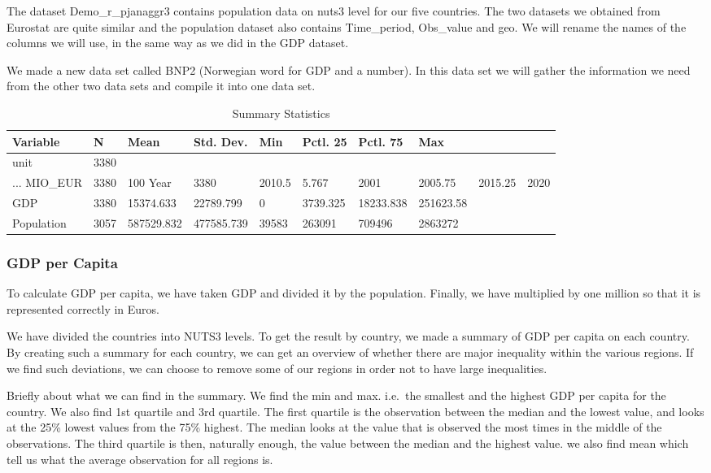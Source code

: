 \documentclass[
]{article}
\begin{document}
The dataset Demo\_r\_pjanaggr3 contains population data on nuts3 level
for our five countries. The two datasets we obtained from Eurostat are
quite similar and the population dataset also contains Time\_period,
Obs\_value and geo. We will rename the names of the columns we will use,
in the same way as we did in the GDP dataset.

We made a new data set called BNP2 (Norwegian word for GDP and a
number). In this data set we will gather the information we need from
the other two data sets and compile it into one data set.

\begin{table}

\caption{\label{tab:unnamed-chunk-1}Summary Statistics}
\centering
\begin{tabular}[t]{llllllll}
\toprule
Variable & N & Mean & Std. Dev. & Min & Pctl. 25 & Pctl. 75 & Max\\
\midrule
unit & 3380 &  &  &  &  &  & \\
... MIO_EUR & 3380 & 100%
Year & 3380 & 2010.5 & 5.767 & 2001 & 2005.75 & 2015.25 & 2020\\
GDP & 3380 & 15374.633 & 22789.799 & 0 & 3739.325 & 18233.838 & 251623.58\\
Population & 3057 & 587529.832 & 477585.739 & 39583 & 263091 & 709496 & 2863272\\
\bottomrule
\end{tabular}
\end{table}

\hypertarget{gdp-per-capita}{%
\subsubsection{GDP per Capita}\label{gdp-per-capita}}

To calculate GDP per capita, we have taken GDP and divided it by the
population. Finally, we have multiplied by one million so that it is
represented correctly in Euros.

We have divided the countries into NUTS3 levels. To get the result by
country, we made a summary of GDP per capita on each country. By
creating such a summary for each country, we can get an overview of
whether there are major inequality within the various regions. If we
find such deviations, we can choose to remove some of our regions in
order not to have large inequalities.

Briefly about what we can find in the summary. We find the min and max.
i.e.~the smallest and the highest GDP per capita for the country. We
also find 1st quartile and 3rd quartile. The first quartile is the
observation between the median and the lowest value, and looks at the
25\% lowest values from the 75\% highest. The median looks at the value
that is observed the most times in the middle of the observations. The
third quartile is then, naturally enough, the value between the median
and the highest value. we also find mean which tell us what the average
observation for all regions is.
\end{document}
